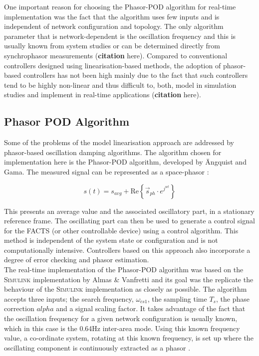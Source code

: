 \documentclass[journal]{IEEEtran}
\begin{document}
One important reason for choosing the Phasor-POD algorithm for real-time implementation was the fact that the algorithm uses few inputs and is independent of network configuration and topology. The only algorithm parameter that is network-dependent is the oscillation frequency and this is usually known from system studies or can be determined directly from synchrophasor measurements (\textbf{citation} here). Compared to conventional controllers designed using linearisation-based methods, the adoption of phasor-based controllers has not been high mainly due to the fact that such controllers tend to be highly non-linear and thus difficult to, both, model in simulation studies \cite{Chaudhuri} and implement in real-time applications (\textbf{citation} here).

\subsection{Phasor POD Algorithm}

Some of the problems of the model linearisation approach are addressed by phasor-based oscillation damping algorithms. The algorithm chosen for implementation here is the Phasor-POD algorithm, developed by \"{A}ngquist and Gama\cite{PhasorPOD}. The measured signal can be represented as a space-phasor \cite{Chaudhuri}: 

\begin{equation}
s(t)={s}_{avg}+\mathrm{Re}\left\{{\stackrel{\to }{s}}_{ph}\cdot {e}^{{j}^{wt}}\right\}
\end{equation}



This presents an average value and the associated oscillatory part, in a stationary reference frame. The oscillating part can then be used to generate a control signal for the FACTS (or other controllable device) using a control algorithm. This method is independent of the system state or configuration and is not computationally intensive. Controllers based on this approach also incorporate a degree of error checking and phasor estimation.\\


The real-time implementation of the Phasor-POD algorithm was based on the \textsc{Simulink} implementation by Almas \& Vanfretti \cite{PhasorPODImplement} and its goal was the replicate the behaviour of the \textsc{Simulink} implementation as closely as possible. The algorithm accepts three inputs; the search frequency, $\omega_{cs1}$, the sampling time $T_{s}$, the phase correction $alpha$ and a signal scaling factor. It takes advantage of the fact that the oscillation frequency for a given network configuration is usually known, which in this case is the 0.64Hz inter-area mode. Using this known frequency value, a  co-ordinate system, rotating at this known frequency, is set up where the oscillating component is continuously extracted as a phasor \cite{PhasorPOD}.
\end{document}
